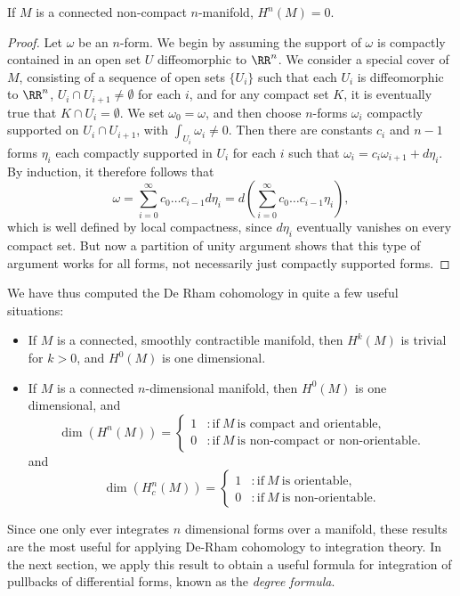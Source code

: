 \begin{theorem}
    If $M$ is a connected non-compact $n$-manifold, $H^n(M) = 0$.
\end{theorem}
\begin{proof}
    Let $\omega$ be an $n$-form. We begin by assuming the support of $\omega$ is compactly contained in an open set $U$ diffeomorphic to $\RR^n$. We consider a special cover of $M$, consisting of a sequence of open sets $\{ U_i \}$ such that each $U_i$ is diffeomorphic to $\RR^n$, $U_i \cap U_{i+1} \neq \emptyset$ for each $i$, and for any compact set $K$, it is eventually true that $K \cap U_i = \emptyset$. We set $\omega_0 = \omega$, and then choose $n$-forms $\omega_i$ compactly supported on $U_i \cap U_{i+1}$, with $\int_{U_i} \omega_i \neq 0$. Then there are constants $c_i$ and $n-1$ forms $\eta_i$ each compactly supported in $U_i$ for each $i$ such that $\omega_i = c_i \omega_{i+1} + d\eta_i$. By induction, it therefore follows that
    \[ \omega = \sum_{i = 0}^\infty c_0 \dots c_{i-1} d\eta_i = d \left( \sum_{i = 0}^\infty c_0 \dots c_{i-1} \eta_i \right), \]
    which is well defined by local compactness, since $d\eta_i$ eventually vanishes on every compact set. But now a partition of unity argument shows that this type of argument works for all forms, not necessarily just compactly supported forms.
\end{proof}

We have thus computed the De Rham cohomology in quite a few useful situations:
%
\begin{itemize}
    \item If $M$ is a connected, smoothly contractible manifold, then $H^k(M)$ is trivial for $k > 0$, and $H^0(M)$ is one dimensional.
    \item If $M$ is a connected $n$-dimensional manifold, then $H^0(M)$ is one dimensional, and
    \[ \dim(H^n(M)) = \begin{cases} 1 &: \text{if}\ M\ \text{is compact and orientable,} \\ 0 &: \text{if}\ M\ \text{is non-compact or non-orientable}. \end{cases} \]
    and
    \[ \dim(H^n_c(M)) = \begin{cases} 1 &: \text{if}\ M\ \text{is orientable,} \\ 0 &: \text{if}\ M\ \text{is non-orientable.} \end{cases} \]
\end{itemize}
%
Since one only ever integrates $n$ dimensional forms over a manifold, these results are the most useful for applying De-Rham cohomology to integration theory. In the next section, we apply this result to obtain a useful formula for integration of pullbacks of differential forms, known as the \emph{degree formula}.


